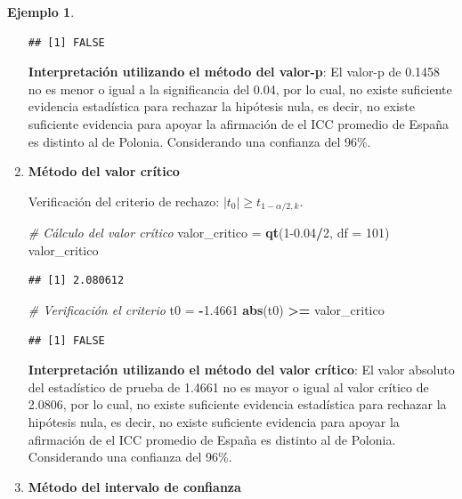 \documentclass[
  11pt,
]{book}
\newenvironment{Shaded}{\begin{snugshade}}{\end{snugshade}}
\newcommand{\AttributeTok}[1]{\textcolor[rgb]{0.13,0.29,0.53}{#1}}
\newcommand{\CommentTok}[1]{\textcolor[rgb]{0.56,0.35,0.01}{\textit{#1}}}
\newcommand{\DecValTok}[1]{\textcolor[rgb]{0.00,0.00,0.81}{#1}}
\newcommand{\FloatTok}[1]{\textcolor[rgb]{0.00,0.00,0.81}{#1}}
\newcommand{\FunctionTok}[1]{\textcolor[rgb]{0.13,0.29,0.53}{\textbf{#1}}}
\newcommand{\NormalTok}[1]{#1}
\newcommand{\OtherTok}[1]{\textcolor[rgb]{0.56,0.35,0.01}{#1}}
\newcommand{\SpecialCharTok}[1]{\textcolor[rgb]{0.81,0.36,0.00}{\textbf{#1}}}
\theoremstyle{definition}
\theoremstyle{definition}
\newtheorem{example}{Ejemplo}[chapter]
\theoremstyle{definition}
\theoremstyle{definition}
\theoremstyle{remark}
\begin{document}
\begin{example}
\begin{enumerate}
\begin{verbatim}
## [1] FALSE
\end{verbatim}

  \textbf{Interpretación utilizando el método del valor-p}: El valor-p de 0.1458 no es menor o igual a la significancia del 0.04, por lo cual, no existe suficiente evidencia estadística para rechazar la hipótesis nula, es decir, no existe suficiente evidencia para apoyar la afirmación de el ICC promedio de España es distinto al de Polonia. Considerando una confianza del 96\%.
\item
  \textbf{Método del valor crítico}

  Verificación del criterio de rechazo: \(|t_0| \geq t_{1-\alpha/2,k}\).

\begin{Shaded}
\begin{Highlighting}[]
\CommentTok{\# Cálculo del valor crítico}
\NormalTok{valor\_critico }\OtherTok{=} \FunctionTok{qt}\NormalTok{(}\DecValTok{1}\FloatTok{{-}0.04}\SpecialCharTok{/}\DecValTok{2}\NormalTok{, }\AttributeTok{df =} \DecValTok{101}\NormalTok{)}
\NormalTok{valor\_critico}
\end{Highlighting}
\end{Shaded}

\begin{verbatim}
## [1] 2.080612
\end{verbatim}

\begin{Shaded}
\begin{Highlighting}[]
\CommentTok{\# Verificación el criterio}
\NormalTok{t0 }\OtherTok{=} \SpecialCharTok{{-}}\FloatTok{1.4661}
\FunctionTok{abs}\NormalTok{(t0) }\SpecialCharTok{\textgreater{}=}\NormalTok{ valor\_critico}
\end{Highlighting}
\end{Shaded}

\begin{verbatim}
## [1] FALSE
\end{verbatim}

  \textbf{Interpretación utilizando el método del valor crítico}: El valor absoluto del estadístico de prueba de 1.4661 no es mayor o igual al valor crítico de 2.0806, por lo cual, no existe suficiente evidencia estadística para rechazar la hipótesis nula, es decir, no existe suficiente evidencia para apoyar la afirmación de el ICC promedio de España es distinto al de Polonia. Considerando una confianza del 96\%.
\item
  \textbf{Método del intervalo de confianza}


\end{enumerate}
\end{example}
\end{document}
